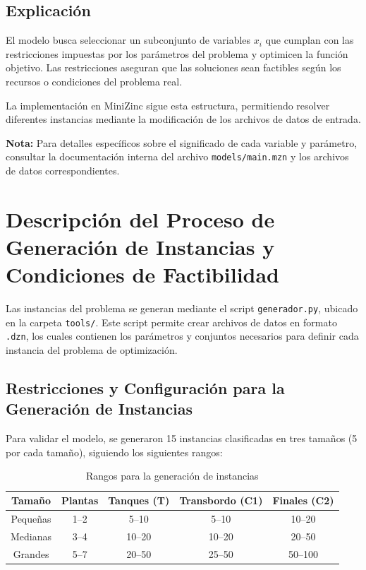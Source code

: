 \documentclass[a4paper,12pt]{article}
\begin{document}
\subsection{Explicación}
El modelo busca seleccionar un subconjunto de variables $x_i$ que cumplan con las restricciones impuestas por los parámetros del problema y optimicen la función objetivo. Las restricciones aseguran que las soluciones sean factibles según los recursos o condiciones del problema real.

La implementación en MiniZinc sigue esta estructura, permitiendo resolver diferentes instancias mediante la modificación de los archivos de datos de entrada.

\textbf{Nota:} Para detalles específicos sobre el significado de cada variable y parámetro, consultar la documentación interna del archivo \texttt{models/main.mzn} y los archivos de datos correspondientes.

\section{Descripción del Proceso de Generación de Instancias y Condiciones de Factibilidad}
Las instancias del problema se generan mediante el script \texttt{generador.py}, ubicado en la carpeta \texttt{tools/}. Este script permite crear archivos de datos en formato \texttt{.dzn}, los cuales contienen los parámetros y conjuntos necesarios para definir cada instancia del problema de optimización.

\subsection{Restricciones y Configuración para la Generación de Instancias}
Para validar el modelo, se generaron 15 instancias clasificadas en tres tamaños (5 por cada tamaño), siguiendo los siguientes rangos:

\begin{table}[H]
\centering
\begin{tabular}{|c|c|c|c|c|}
\hline
\textbf{Tamaño} & \textbf{Plantas} & \textbf{Tanques (T)} & \textbf{Transbordo (C1)} & \textbf{Finales (C2)} \\
\hline
Pequeñas & 1--2 & 5--10 & 5--10 & 10--20 \\
Medianas & 3--4 & 10--20 & 10--20 & 20--50 \\
Grandes & 5--7 & 20--50 & 25--50 & 50--100 \\
\hline
\end{tabular}
\caption{Rangos para la generación de instancias}
\end{table}
\end{document}
